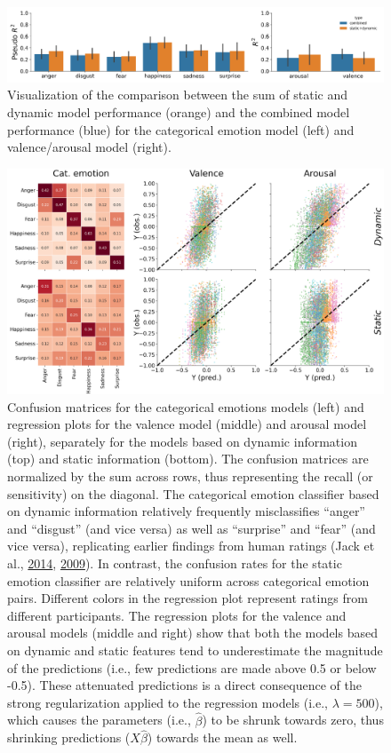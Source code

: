\documentclass[12pt,american,a4paper,oneside,]{memoir} %
\begin{document}
\begin{figure}
\centering
\includegraphics{_bookdown_files/static-vs-dynamic-files/figures/figure_S4.pdf}
\caption{\label{fig:fig-svsd-S4}Visualization of the comparison between the sum of static and dynamic model performance (orange) and the combined model performance (blue) for the categorical emotion model (left) and valence/arousal model (right).}
\end{figure}



\begin{figure}
\centering
\includegraphics{_bookdown_files/static-vs-dynamic-files/figures/figure_S5.pdf}
\caption{\label{fig:fig-svsd-S5}Confusion matrices for the categorical emotions models (left) and regression plots for the valence model (middle) and arousal model (right), separately for the models based on dynamic information (top) and static information (bottom). The confusion matrices are normalized by the sum across rows, thus representing the recall (or sensitivity) on the diagonal. The categorical emotion classifier based on dynamic information relatively frequently misclassifies ``anger'' and ``disgust'' (and vice versa) as well as ``surprise'' and ``fear'' (and vice versa), replicating earlier findings from human ratings (Jack et al., \protect\hyperlink{ref-Jack2014-ku}{2014}, \protect\hyperlink{ref-Jack2009-yy}{2009}). In contrast, the confusion rates for the static emotion classifier are relatively uniform across categorical emotion pairs. Different colors in the regression plot represent ratings from different participants. The regression plots for the valence and arousal models (middle and right) show that both the models based on dynamic and static features tend to underestimate the magnitude of the predictions (i.e., few predictions are made above 0.5 or below -0.5). These attenuated predictions is a direct consequence of the strong regularization applied to the regression models (i.e., \(\lambda = 500\)), which causes the parameters (i.e., \(\hat{\beta}\)) to be shrunk towards zero, thus shrinking predictions (\(X\hat{\beta}\)) towards the mean as well.}
\end{figure}
\end{document}
